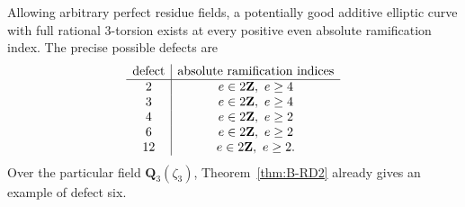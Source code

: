 \begin{theorem}[B-RD10: all first-level defects at $p=3$]\label{thm:B-RD10}
Allowing arbitrary perfect residue fields, a potentially good additive
elliptic curve with full rational $3$-torsion exists at every positive
even absolute ramification index. The precise possible defects are
\[
\begin{array}{c|c}
\text{defect}&\text{absolute ramification indices}\\\hline
2& e\in2\mathbf Z,\ e\geq4\cr
3& e\in2\mathbf Z,\ e\geq4\cr
4& e\in2\mathbf Z,\ e\geq2\cr
6& e\in2\mathbf Z,\ e\geq2\cr
12& e\in2\mathbf Z,\ e\geq2.
\end{array}
\]
Over the particular field $\mathbf Q_3(\zeta_3)$, Theorem~\ref{thm:B-RD2}
already gives an example of defect six.
\end{theorem}
